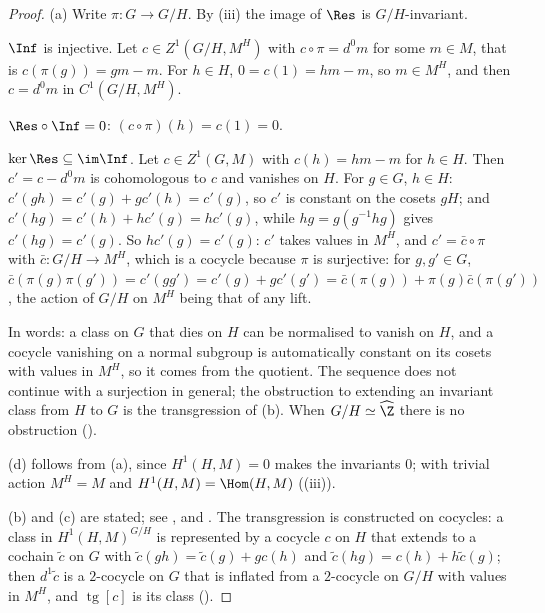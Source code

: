 \begin{proof}
(a) Write $\pi\colon G\to G/H$. By (iii) the image of $\Res$ is $G/H$-invariant.

$\Inf$ is injective. Let $c\in Z^1(G/H,M^H)$ with $c\circ\pi=d^0m$ for some $m\in M$, that is $c(\pi(g))=gm-m$. For $h\in H$, $0=c(1)=hm-m$, so $m\in M^H$, and then
$c=d^0m$ in $C^1(G/H,M^H)$.

$\Res\circ\Inf=0$: $(c\circ\pi)(h)=c(1)=0$.

$\ker\Res\subseteq\im\Inf$. Let $c\in Z^1(G,M)$ with $c(h)=hm-m$ for $h\in H$. Then $c'=c-d^0m$ is cohomologous to $c$ and vanishes on $H$. For $g\in G$,
$h\in H$: $c'(gh)=c'(g)+gc'(h)=c'(g)$, so $c'$ is constant on the cosets $gH$; and $c'(hg)=c'(h)+hc'(g)=hc'(g)$, while $hg=g(g^{-1}hg)$ gives
$c'(hg)=c'(g)$. So $hc'(g)=c'(g)$: $c'$ takes values in $M^H$, and $c'=\bar c\circ\pi$ with $\bar c\colon G/H\to M^H$, which is a cocycle because $\pi$ is surjective:
for $g,g'\in G$, $\bar c(\pi(g)\pi(g'))=c'(gg')=c'(g)+gc'(g')=\bar c(\pi(g))+\pi(g)\bar c(\pi(g'))$, the action of $G/H$ on $M^H$ being that of any lift.

In words: a class on $G$ that dies on $H$ can be normalised to vanish on $H$, and a cocycle vanishing on a normal subgroup is automatically constant on its cosets
with values in $M^H$, so it comes from the quotient. The sequence does not continue with a surjection in general; the obstruction to extending an invariant class
from $H$ to $G$ is the transgression of (b). When $G/H\simeq\widehat\Z$ there is no obstruction ().

(d) follows from (a), since $H^1(H,M)=0$ makes the invariants $0$; with trivial action $M^H=M$ and $H^1(H,M)=\Hom(H,M)$ ((iii)).

(b) and (c) are stated; see \cite[Chapter VII, Section 6]{SerreLocalFields}, \cite[Chapter I, Section 6 and Chapter II, Section 4]{NSW} and \cite[Section 6.8]{Weibel}.
The transgression is constructed on cocycles: a class in $H^1(H,M)^{G/H}$ is represented by a cocycle $c$ on $H$ that extends to a cochain $\tilde c$ on $G$
with $\tilde c(gh)=\tilde c(g)+g c(h)$ and $\tilde c(hg)=c(h)+h\tilde c(g)$; then $d^1\tilde c$ is a $2$-cocycle on $G$ that is inflated from a $2$-cocycle on $G/H$ with values in $M^H$,
and $\operatorname{tg}[c]$ is its class ().
\end{proof}

